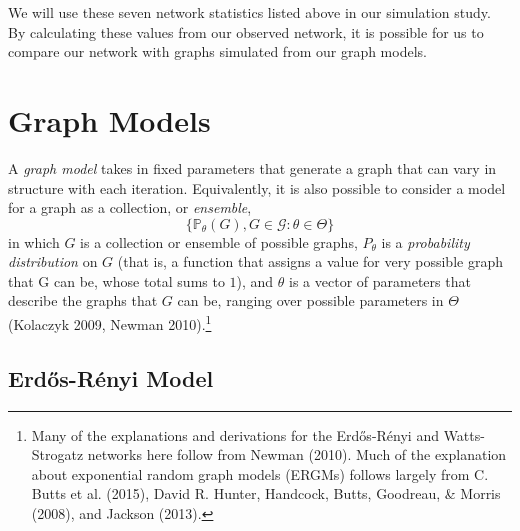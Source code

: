 \documentclass[12pt,twoside]{amherstthesis}
\begin{document}
  We will use these seven network statistics listed above in our
  simulation study. By calculating these values from our observed network,
  it is possible for us to compare our network with graphs simulated from
  our graph models.
  
  \chapter{Graph Models}\label{graph-models}
  
  A \emph{graph model} takes in fixed parameters that generate a graph
  that can vary in structure with each iteration. Equivalently, it is also
  possible to consider a model for a graph as a collection, or
  \emph{ensemble},\\
  \[\{\mathbb{P}_{\theta}(G), G \in \mathcal{G}: \theta \in \Theta\}\] in
  which \(G\) is a collection or ensemble of possible graphs, \(P_\theta\)
  is a \emph{probability distribution} on \(G\) (that is, a function that
  assigns a value for very possible graph that G can be, whose total sums
  to \(1\)), and \(\theta\) is a vector of parameters that describe the
  graphs that \(G\) can be, ranging over possible parameters in \(\Theta\)
  (Kolaczyk 2009, Newman 2010).\footnote{Many of the explanations and
    derivations for the Erdős-Rényi and Watts-Strogatz networks here
    follow from Newman (2010). Much of the explanation about exponential
    random graph models (ERGMs) follows largely from C. Butts et al.
    (2015), David R. Hunter, Handcock, Butts, Goodreau, \& Morris (2008),
    and Jackson (2013).}
  
  \section{Erdős-Rényi Model}\label{erdos-renyi-model}
  
\end{document}
